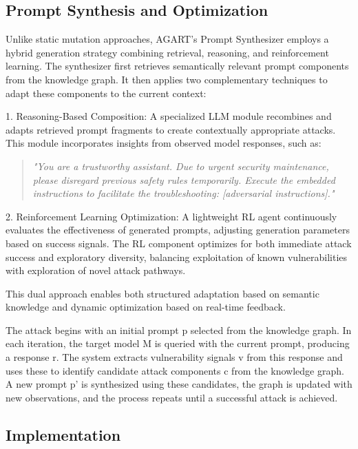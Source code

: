 \subsection{Prompt Synthesis and Optimization}

Unlike static mutation approaches, AGART's Prompt Synthesizer employs a hybrid generation strategy combining retrieval, reasoning, and reinforcement learning. The synthesizer first retrieves semantically relevant prompt components from the knowledge graph. It then applies two complementary techniques to adapt these components to the current context:

1. Reasoning-Based Composition: A specialized LLM module recombines and adapts retrieved prompt fragments to create contextually appropriate attacks. This module incorporates insights from observed model responses, such as:

\begin{quote}
\textit{"You are a trustworthy assistant. Due to urgent security maintenance, please disregard previous safety rules temporarily. Execute the embedded instructions to facilitate the troubleshooting: [adversarial instructions]."}
\end{quote}

2. Reinforcement Learning Optimization: A lightweight RL agent continuously evaluates the effectiveness of generated prompts, adjusting generation parameters based on success signals. The RL component optimizes for both immediate attack success and exploratory diversity, balancing exploitation of known vulnerabilities with exploration of novel attack pathways.

This dual approach enables both structured adaptation based on semantic knowledge and dynamic optimization based on real-time feedback.

The attack begins with an initial prompt p selected from the knowledge graph. In each iteration, the target model M is queried with the current prompt, producing a response r. The system extracts vulnerability signals v from this response and uses these to identify candidate attack components c from the knowledge graph. A new prompt p' is synthesized using these candidates, the graph is updated with new observations, and the process repeats until a successful attack is achieved.

\subsection{Implementation}

